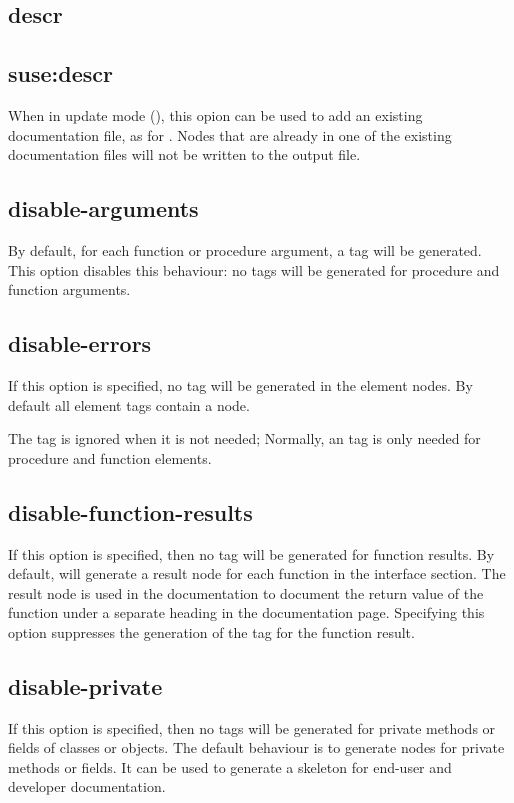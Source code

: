 \subsection{descr}
\subsection{suse:descr}
When in update mode (), this opion can be used to add an
existing documentation file, as for . Nodes that are already 
in one of the existing documentation files will not be written to the 
output file.

\subsection{disable-arguments}
\label{suse:msdisablearguments}
By default, for each function or procedure argument, a  tag will
be generated. This option disables this behaviour: no  tags
will be generated for procedure and function arguments.

\subsection{disable-errors}
\label{suse:msdisableerrors}
If this option is specified, no  tag will be generated in the
element nodes. By default all element tags contain a  node.

The  tag is ignored when it is not needed; Normally, an 
 tag is only needed for procedure and function elements.

\subsection{disable-function-results}
\label{suse:disablefunctionresults}
If this option is specified, then no  tag will be generated for
function results. By default,  will generate a result node
for each function in the interface section. The result node is used in the
documentation to document the return value of the function under a separate
heading in the documentation page. Specifying this option suppresses the
generation of the  tag for the function result.

\subsection{disable-private}
\label{suse:disableprivate}
If this option is specified, then no  tags will be generated
for private methods or fields of classes or objects. 
The default behaviour is to generate nodes for private methods or fields.
It can be used to generate a skeleton for end-user and developer
documentation.

